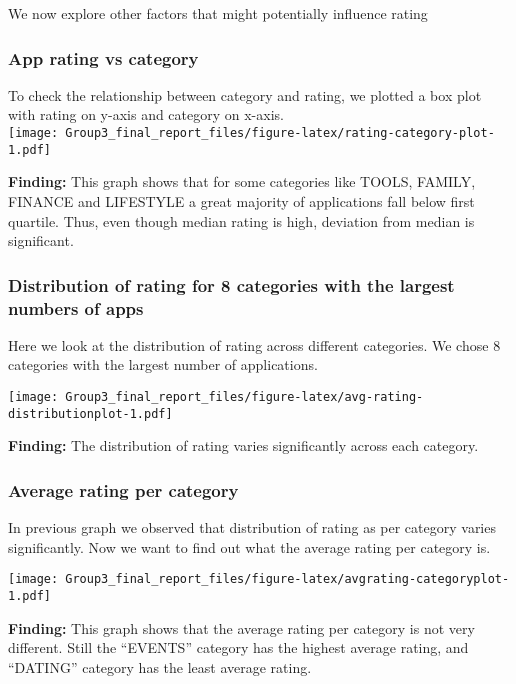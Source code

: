 \documentclass[
]{article}
\begin{document}
We now explore other factors that might potentially influence rating

\hypertarget{app-rating-vs-category}{%
\subsubsection{App rating vs category}\label{app-rating-vs-category}}

To check the relationship between category and rating, we plotted a box
plot with rating on y-axis and category on x-axis.\\
\texttt{[image: Group3\_final\_report\_files/figure-latex/rating-category-plot-1.pdf]}

\textbf{Finding:} This graph shows that for some categories like TOOLS,
FAMILY, FINANCE and LIFESTYLE a great majority of applications fall
below first quartile. Thus, even though median rating is high, deviation
from median is significant.

\hypertarget{distribution-of-rating-for-8-categories-with-the-largest-numbers-of-apps}{%
\subsubsection{Distribution of rating for 8 categories with the largest
numbers of
apps}\label{distribution-of-rating-for-8-categories-with-the-largest-numbers-of-apps}}

Here we look at the distribution of rating across different categories.
We chose 8 categories with the largest number of applications.

\texttt{[image: Group3\_final\_report\_files/figure-latex/avg-rating-distributionplot-1.pdf]}

\textbf{Finding:} The distribution of rating varies significantly across
each category.

\hypertarget{average-rating-per-category}{%
\subsubsection{Average rating per
category}\label{average-rating-per-category}}

In previous graph we observed that distribution of rating as per
category varies significantly. Now we want to find out what the average
rating per category is.

\texttt{[image: Group3\_final\_report\_files/figure-latex/avgrating-categoryplot-1.pdf]}

\textbf{Finding:} This graph shows that the average rating per category
is not very different. Still the ``EVENTS'' category has the highest
average rating, and ``DATING'' category has the least average rating.
\end{document}
